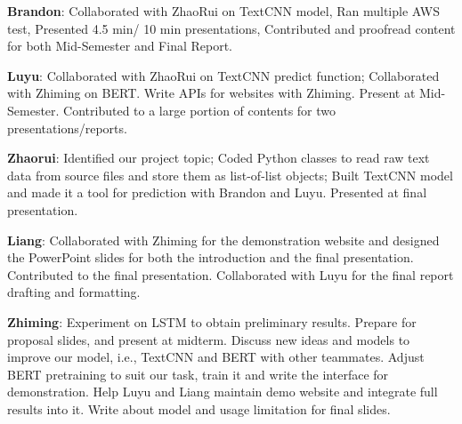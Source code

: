 \documentclass{article}
\begin{document}
\textbf{Brandon}: Collaborated with ZhaoRui on TextCNN model, Ran multiple AWS test, Presented 4.5 min/ 10 min presentations, Contributed and proofread content for both Mid-Semester and Final Report.  

\textbf{Luyu}: Collaborated with ZhaoRui on TextCNN predict function; Collaborated with Zhiming on BERT. Write APIs for websites with Zhiming. Present at Mid-Semester. Contributed to a large portion of contents for two presentations/reports.

\textbf{Zhaorui}: Identified our project topic; Coded Python classes to read raw text data from source files and store them as list-of-list objects; Built TextCNN model and made it a tool for prediction with Brandon and Luyu. Presented at final presentation. 

\textbf{Liang}: Collaborated with Zhiming for the demonstration website and designed the PowerPoint slides for both the introduction and the final presentation. Contributed to the final presentation. Collaborated with Luyu for the final report drafting and formatting. 

\textbf{Zhiming}: Experiment on LSTM to obtain preliminary results. Prepare for proposal slides, and present at midterm. Discuss new ideas and models to improve our model, i.e., TextCNN and BERT with other teammates. Adjust BERT pretraining to suit our task, train it and write the interface for demonstration. Help Luyu and Liang maintain demo website and integrate full results into it. Write about model and usage limitation for final slides. %
\end{document}
